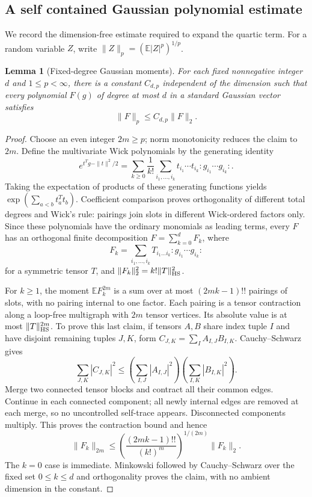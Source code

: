 \documentclass[11pt]{article}
\newtheorem{lemma}[theorem]{Lemma}
\theoremstyle{definition}\newtheorem{definition}[theorem]{Definition}
\theoremstyle{remark}\newtheorem{remark}[theorem]{Remark}
\newcommand{\E}{\mathbb E}
\begin{document}
\subsection{A self contained Gaussian polynomial estimate}
We record the dimension-free estimate required to expand the quartic term.
For a random variable $Z$, write $\|Z\|_p=(\E|Z|^p)^{1/p}$.

\begin{lemma}[Fixed-degree Gaussian moments]\label{zsm:lem:moments}
For each fixed nonnegative integer $d$ and $1\le p<\infty$, there is a constant
$C_{d,p}$ independent of the dimension such that every polynomial $F(g)$ of
degree at most $d$ in a standard Gaussian vector satisfies
\[
 \|F\|_p\le C_{d,p}\|F\|_2.
\]
\end{lemma}
\begin{proof}
Choose an even integer $2m\ge p$; norm monotonicity reduces the claim to $2m$.
Define the multivariate Wick polynomials by the generating identity
\[
 e^{t^Tg-\|t\|^2/2}=\sum_{k\ge0}\frac1{k!}
 \sum_{i_1,\ldots,i_k}t_{i_1}\cdots t_{i_k}
 :g_{i_1}\cdots g_{i_k}:.
\]
Taking the expectation of products of these generating functions yields
$\exp(\sum_{a<b}t_a^Tt_b)$. Coefficient comparison proves orthogonality of
different total degrees and Wick's rule: pairings join slots in different
Wick-ordered factors only. Since these polynomials have the ordinary monomials
as leading terms, every $F$ has an orthogonal finite decomposition
$F=\sum_{k=0}^dF_k$, where
\[
 F_k=\sum_{i_1,\ldots,i_k}T_{i_1\ldots i_k}
 :g_{i_1}\cdots g_{i_k}:
\]
for a symmetric tensor $T$, and $\|F_k\|_2^2=k!\|T\|_{\rm HS}^2$.

For $k\ge1$, the moment $\E F_k^{2m}$ is a sum over at most $(2mk-1)!!$
pairings of slots, with no pairing internal to one factor. Each pairing is a
tensor contraction along a loop-free multigraph with $2m$ tensor vertices.
Its absolute value is at most $\|T\|_{\rm HS}^{2m}$. To prove this last claim,
if tensors $A,B$ share index tuple $I$ and have disjoint remaining tuples $J,K$,
form $C_{J,K}=\sum_I A_{I,J}B_{I,K}$. Cauchy--Schwarz gives
\[
 \sum_{J,K}|C_{J,K}|^2
 \le\left(\sum_{I,J}|A_{I,J}|^2\right)
      \left(\sum_{I,K}|B_{I,K}|^2\right).
\]
Merge two connected tensor blocks and contract all their common edges.
Continue in each connected component; all newly internal edges are removed at
each merge, so no uncontrolled self-trace appears. Disconnected components
multiply. This proves the contraction bound and hence
\[
 \|F_k\|_{2m}\le
 \left(\frac{(2mk-1)!!}{(k!)^m}\right)^{1/(2m)}\|F_k\|_2.
\]
The $k=0$ case is immediate. Minkowski followed by Cauchy--Schwarz over the
fixed set $0\le k\le d$ and orthogonality proves the claim, with no ambient
dimension in the constant.
\end{proof}
\end{document}
